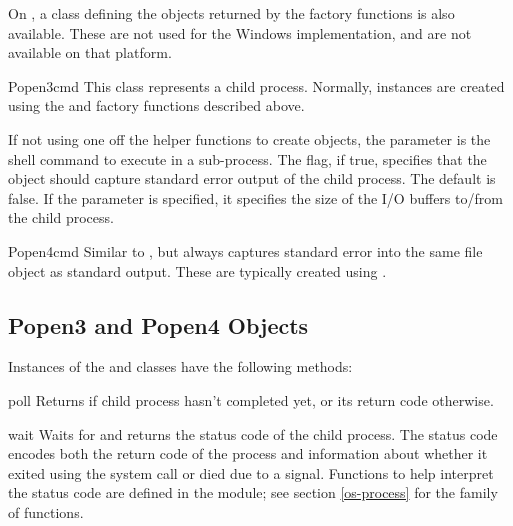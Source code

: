 On \UNIX, a class defining the objects returned by the factory
functions is also available.  These are not used for the Windows
implementation, and are not available on that platform.

\begin{classdesc}{Popen3}{cmd}
This class represents a child process.  Normally, 
instances are created using the  and
 factory functions described above.

If not using one off the helper functions to create 
objects, the parameter  is the shell command to execute in a
sub-process.  The  flag, if true, specifies that
the object should capture standard error output of the child process.
The default is false.  If the  parameter is specified, it
specifies the size of the I/O buffers to/from the child process.
\end{classdesc}

\begin{classdesc}{Popen4}{cmd}
Similar to , but always captures standard error into the
same file object as standard output.  These are typically created
using .
\end{classdesc}


\subsection{Popen3 and Popen4 Objects \label{popen3-objects}}

Instances of the  and  classes have the
following methods:

\begin{methoddesc}{poll}{}
Returns  if child process hasn't completed yet, or its return 
code otherwise.
\end{methoddesc}

\begin{methoddesc}{wait}{}
Waits for and returns the status code of the child process.  The
status code encodes both the return code of the process and
information about whether it exited using the 
system call or died due to a signal.  Functions to help interpret the
status code are defined in the  module; see section
\ref{os-process} for the  family of functions.
\end{methoddesc}


